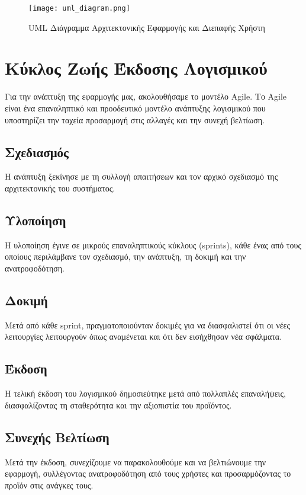 \documentclass{article}
\begin{document}
\begin{figure}[h!]
    \centering
    \texttt{[image: uml\_diagram.png]}
    \caption{UML Διάγραμμα Αρχιτεκτονικής Εφαρμογής και Διεπαφής Χρήστη}
    \label{fig:uml_diagram}
\end{figure}

\section{Κύκλος Ζωής Έκδοσης Λογισμικού}
Για την ανάπτυξη της εφαρμογής μας, ακολουθήσαμε το μοντέλο Agile. Το Agile είναι ένα επαναληπτικό και προοδευτικό μοντέλο ανάπτυξης λογισμικού που υποστηρίζει την ταχεία προσαρμογή στις αλλαγές και την συνεχή βελτίωση.

\subsection{Σχεδιασμός}
Η ανάπτυξη ξεκίνησε με τη συλλογή απαιτήσεων και τον αρχικό σχεδιασμό της αρχιτεκτονικής του συστήματος. 

\subsection{Υλοποίηση}
Η υλοποίηση έγινε σε μικρούς επαναληπτικούς κύκλους (sprints), κάθε ένας από τους οποίους περιλάμβανε τον σχεδιασμό, την ανάπτυξη, τη δοκιμή και την ανατροφοδότηση.

\subsection{Δοκιμή}
Μετά από κάθε sprint, πραγματοποιούνταν δοκιμές για να διασφαλιστεί ότι οι νέες λειτουργίες λειτουργούν όπως αναμένεται και ότι δεν εισήχθησαν νέα σφάλματα.

\subsection{Έκδοση}
Η τελική έκδοση του λογισμικού δημοσιεύτηκε μετά από πολλαπλές επαναλήψεις, διασφαλίζοντας τη σταθερότητα και την αξιοπιστία του προϊόντος.

\subsection{Συνεχής Βελτίωση}
Μετά την έκδοση, συνεχίζουμε να παρακολουθούμε και να βελτιώνουμε την εφαρμογή, συλλέγοντας ανατροφοδότηση από τους χρήστες και προσαρμόζοντας το προϊόν στις ανάγκες τους.
\end{document}
